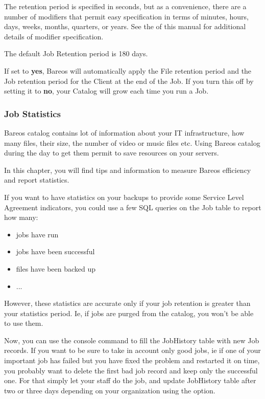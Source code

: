 \begin{description}
The retention period is specified in seconds, but as a convenience, there
are a number of modifiers that permit easy specification in terms of
minutes, hours, days, weeks, months, quarters, or years.
See the  of this manual for additional details of
modifier specification.

The default Job Retention period is 180 days.

\item {}
   If set to  {\bf yes},
Bareos will automatically apply
the File retention period and the Job  retention period for the Client at the
end of the Job.
If you turn this off by setting it to {\bf no}, your  Catalog will grow each
time you run a Job.
\end{description}


\subsubsection{Job Statistics}

\label{sec:JobStatistics}


Bareos catalog contains lot of information about your IT infrastructure, how
many files, their size, the number of video or music files etc. Using Bareos
catalog during the day to get them permit to save resources on your servers.

In this chapter, you will find tips and information to measure Bareos
efficiency and report statistics.

If you want to have statistics on your backups to
provide some Service Level Agreement indicators, you could use a few
SQL queries on the Job table to report how many:

\begin{itemize}
\item jobs have run
\item jobs have been successful
\item files have been backed up
\item ...
\end{itemize}

However, these statistics are accurate only if your job retention is greater
than your statistics period. Ie, if jobs are purged from the catalog, you won't
be able to use them.

Now, you can use the  console command to fill
the JobHistory table with new Job records. If you want to be sure to take in
account only good jobs, ie if one of your important job has failed but
you have fixed the problem and restarted it on time, you probably want to
delete the first bad job record and keep only the successful one. For
that simply let your staff do the job, and update JobHistory table after two or
three days depending on your organization using the \parameter{[days=num]} option.

